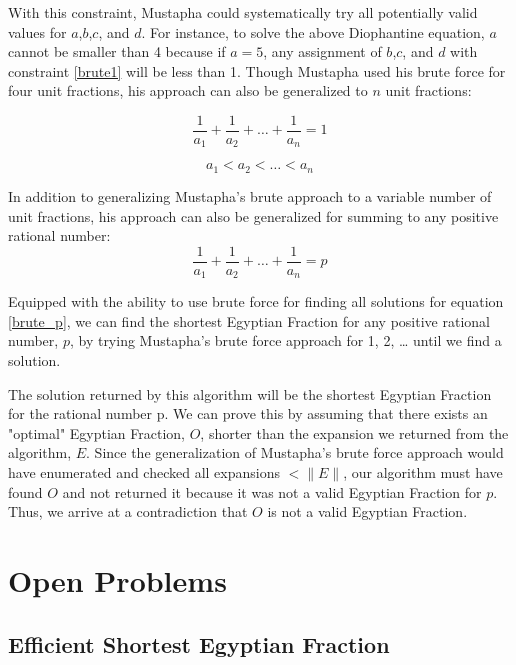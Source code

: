 \documentclass[paper=a4, fontsize=11pt]{scrartcl}
\numberwithin{equation}{section}	 %
\numberwithin{figure}{section}	 %
\numberwithin{table}{section}	 %
\begin{document}
With this constraint, Mustapha could systematically try all potentially valid values for $a$,$b$,$c$, and $d$. For instance, to solve the above Diophantine equation, $a$ cannot be smaller than 4 because if $a=5$, any assignment of $b$,$c$, and $d$ with constraint \ref{brute1} will be less than 1. Though Mustapha used his brute force for four unit fractions, his approach can also be generalized to $n$ unit fractions:

\begin{equation}
	\frac{1}{a_1} + \frac{1}{a_2} + \ldots + \frac{1}{a_n} = 1
\end{equation}

\begin{equation}\label{brute1}
	a_1 < a_2 < \ldots < a_n
\end{equation}

In addition to generalizing Mustapha’s brute approach to a variable number of unit fractions, his approach can also be generalized for summing to any positive rational number:
\begin{equation}\label{brute_p}
	\frac{1}{a_1} + \frac{1}{a_2} + \ldots + \frac{1}{a_n} = p
\end{equation}

Equipped with the ability to use brute force for finding all solutions for equation \ref{brute_p}, we can find the shortest Egyptian Fraction for any positive rational number, $p$, by trying Mustapha’s brute force approach for 1, 2, … until we find a solution.

The solution returned by this algorithm will be the shortest Egyptian Fraction for the rational number p. We can prove this by assuming that there exists an "optimal" Egyptian Fraction, $O$, shorter than the expansion we returned from the algorithm, $E$. Since the generalization of Mustapha’s brute force approach would have enumerated and checked all expansions $< \|E\|$, our algorithm must have found $O$ and not returned it because it was not a valid Egyptian Fraction for $p$. Thus, we arrive at a contradiction that $O$ is not a valid Egyptian Fraction. 

\section{Open Problems}
\subsection{Efficient Shortest Egyptian Fraction}
\end{document}
